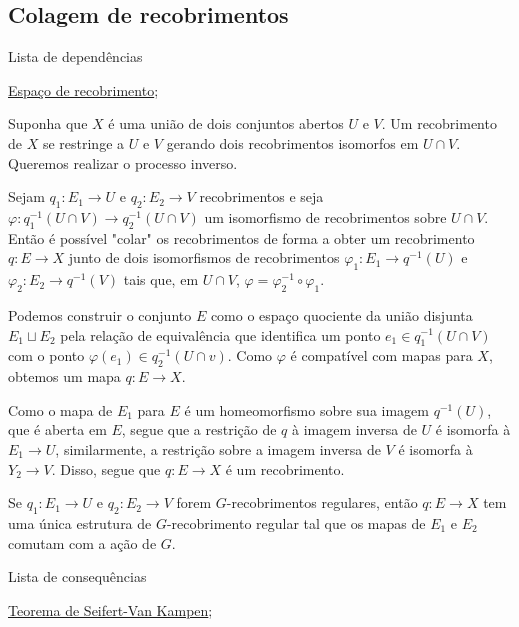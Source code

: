 \subsection{Colagem de recobrimentos}
\label{colagem-de-recobrimentos-prop}
\begin{titlemize}{Lista de dependências}
	\item \hyperref[espaco-de-recobrimento]{Espaço de recobrimento};
\end{titlemize}
Suponha que $X$ é uma união de dois conjuntos abertos $U$ e $V$. Um recobrimento de $X$ se restringe a $U$ e $V$ gerando dois recobrimentos isomorfos em $U \cap V$. Queremos realizar o processo inverso.
\begin{thm} 
	Sejam $q_1: E_1 \longrightarrow U$ e $q_2: E_2 \longrightarrow V$ recobrimentos e seja $\varphi: q_1^{-1}(U \cap V) \longrightarrow q_2^{-1}(U \cap V)$ um isomorfismo de recobrimentos sobre $U \cap V$. Então é possível "colar" os recobrimentos de forma a obter um recobrimento $q:E \longrightarrow X$ junto de dois isomorfismos de recobrimentos $\varphi_1:E_1 \longrightarrow q^{-1}(U)$  e $\varphi_2:E_2 \longrightarrow q^{-1}(V)$ tais que, em $U \cap V$, $\varphi = \varphi_2^{-1} \circ \varphi_1$.
\end{thm}

\begin{dem}
    Podemos construir o conjunto $E$ como o espaço quociente da união disjunta $E_1 \sqcup E_2$ pela relação de equivalência que identifica um ponto $e_1 \in q_1^{-1}(U \cap V)$ com o ponto $\varphi(e_1) \in q_2^{-1}(U \cap v)$. Como $\varphi$ é compatível com mapas para $X$, obtemos um mapa $q:E \longrightarrow X$.

    Como o mapa de $E_1$ para $E$ é um homeomorfismo sobre sua imagem $q^{-1}(U)$, que é aberta em $E$, segue que a restrição de $q$ à imagem inversa de $U$ é isomorfa à $E_1 \longrightarrow U$, similarmente, a restrição sobre a imagem inversa de $V$ é isomorfa à $Y_2 \longrightarrow V$. Disso, segue que $q:E \longrightarrow X$ é um recobrimento.
\end{dem}

\begin{corol}
    Se $q_1:E_1 \longrightarrow U$ e $q_2:E_2 \longrightarrow V$ forem $G$-recobrimentos regulares, então $q:E \longrightarrow X$ tem uma única estrutura de $G$-recobrimento regular tal que os mapas de $E_1$ e $E_2$ comutam com a ação de $G$.
\end{corol}

\begin{titlemize}{Lista de consequências}
	\item \hyperref[seifert-van-kampen-prop]{Teorema de Seifert-Van Kampen};
\end{titlemize}
